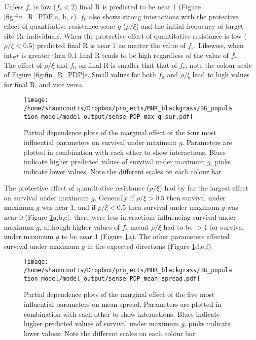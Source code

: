 \documentclass[12pt,a4paper]{article}
\begin{document}
Unless $f_r$ is low ($f_r < 2$) final R is predicted to be near 1 (Figure \ref{fig:fin_R_PDP}a, b, c). $f_r$ also shows strong interactions with the protective effect of quantitative resistance score $g$ ($\rho / \xi$) and the initial frequency of target site Rr individuals. When the protective effect of quantitative resistance is low ($\rho / \xi < 0.5$) predicted final R is near 1 no matter the value of $f_r$. Likewise, when int$_Rr$ is  greater than 0.1 final R tends to be high regardless of the value of $f_r$. The effect of $\rho / \xi$ and $f_0$ on final R is smaller that that of $f_r$, note the colour scale of Figure \ref{fig:fin_R_PDP}e. Small values for both $f_0$ and $\rho / \xi$ lead to high values for final R, and vice versa.           

\begin{figure}[H] 
	\centering
	\texttt{[image: /home/shauncoutts/Dropbox/projects/MHR\_blackgrass/BG\_population\_model/model\_output/sense\_PDP\_max\_g\_sur.pdf]}
	\caption{Partial dependence plots of the marginal effect of the four most influential parameters on survival under maximum $g$. Parameters are plotted in combination with each other to show interactions. Blues indicate higher predicted values of survival under maximum $g$, pinks indicate lower values. Note the different scales on each colour bar.}
	\label{fig:sur_mg_PDP}
\end{figure}

The protective effect of quantitative resistance ($\rho / \xi$) had by far the largest effect on survival under maximum $g$. Generally if $\rho / \xi > 0.5$ then survival under maximum $g$ was near 1, and if $\rho / \xi < 0.5$ then survival under maximum $g$ was near 0 (Figure \ref{fig:sur_mg_PDP}a,b,c). there were less interactions influencing survival under maximum $g$, although higher values of $f_r$ meant $\rho / \xi$ had to be $> 1$ for survival under maximum $g$ to be near 1 (Figure \ref{fig:sur_mg_PDP}a). The other parameters affected survival under maximum $g$ in the expected directions (Figure \ref{fig:sur_mg_PDP}d,e,f).     

\begin{figure}[H] 
	\centering
	\texttt{[image: /home/shauncoutts/Dropbox/projects/MHR\_blackgrass/BG\_population\_model/model\_output/sense\_PDP\_mean\_spread.pdf]}
	\caption{Partial dependence plots of the marginal effect of the five most influential parameters on mean spread. Parameters are plotted in combination with each other to show interactions. Blues indicate higher predicted values of survival under maximum $g$, pinks indicate lower values. Note the different scales on each colour bar.}
	\label{fig:mean_spread_PDP}
\end{figure}
\end{document}

